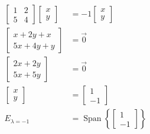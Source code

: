\documentclass[10pt]{article}
\DeclareMathOperator{\SPAN}{Span}
\begin{document}
\begin{align*}
        \begin{bmatrix}
        1 & 2 \\
        5 & 4  
        \end{bmatrix} 
        \left[ \begin{array}{c} 
        x \\
        y 
        \end{array} 
        \right]  &= 
        -1\left[ \begin{array}{c} 
        x \\
        y 
        \end{array} \right] \\
        \left[ \begin{array}{c} 
        x + 2y + x\\
        5x + 4y + y 
        \end{array} 
        \right] &= \vec{0} \\
        \left[ \begin{array}{c} 
        2x + 2y \\
        5x + 5y 
        \end{array} 
        \right] &= \vec{0} \\
        \left[ \begin{array}{c} 
        x \\
        y 
        \end{array} 
        \right] &= 
        \left[\begin{array}{c} 
        1 \\
        -1 
        \end{array} 
        \right] \\ 
        \mathit{E}_{\lambda=-1} &= \SPAN \left\{
            \left[ \begin{array}{c}   
            1 \\
            -1 
            \end{array} \right]
        \right\}
\end{align*}
\end{document}
